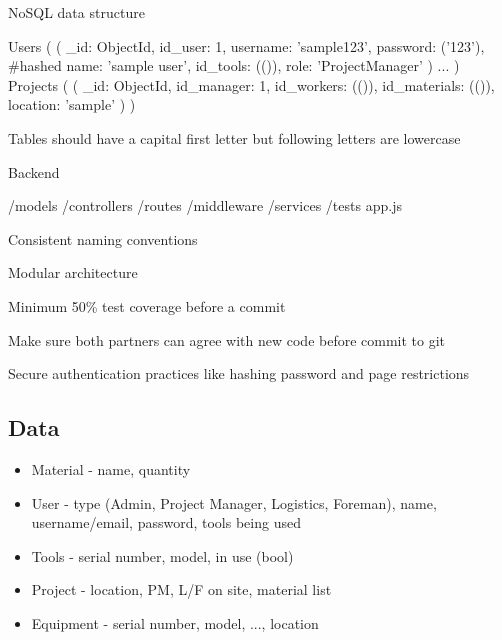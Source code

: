 \documentclass{article}
\begin{document}
NoSQL data structure

Users
    (
        (
        \_id: ObjectId,
        id\_user: 1,
        username: 'sample123',
        password: ('123'), \#hashed
        name: 'sample user',
        id\_tools: (()),
        role: 'ProjectManager'
        )
        ...
    )
Projects
    (
        (
        \_id: ObjectId,
        id\_manager: 1,
        id\_workers: (()),
        id\_materials: (()),
        location: 'sample'
        )
    )

Tables should have a capital first letter but following letters are lowercase

Backend

/models
/controllers
/routes
/middleware
/services
/tests
app.js

Consistent naming conventions

Modular architecture

Minimum 50\% test coverage before a commit

Make sure both partners can agree with new code before commit to git

Secure authentication practices like hashing password and page restrictions




\subsection{Data}


\begin{itemize}
    \item Material - name, quantity
    \item User - type (Admin, Project Manager, Logistics, Foreman), name, username/email, password, tools being used
    \item Tools - serial number, model, in use (bool)
    \item Project - location, PM, L/F on site, material list
    \item Equipment - serial number, model, ..., location
\end{itemize}
\end{document}
